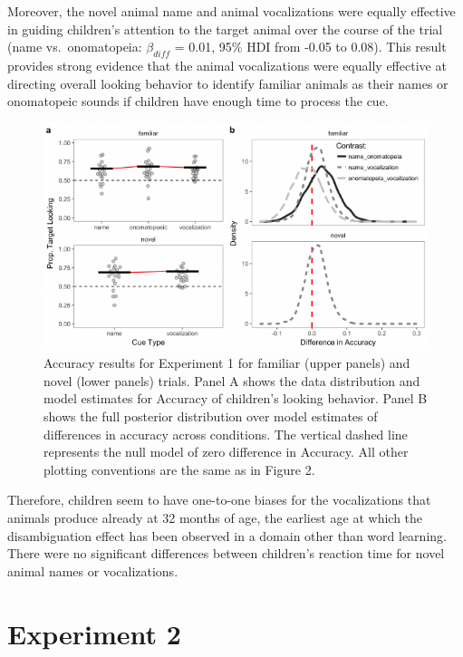 \documentclass[english,floatsintext,man]{apa6}
\theoremstyle{definition}
\theoremstyle{definition}
\theoremstyle{definition}
\theoremstyle{remark}
\begin{document}
Moreover, the novel animal name and animal vocalizations were equally
effective in guiding children's attention to the target animal over the
course of the trial (name vs.~onomatopeia: \(\beta_{diff}\) = 0.01, 95\%
HDI from -0.05 to 0.08). This result provides strong evidence that the
animal vocalizations were equally effective at directing overall looking
behavior to identify familiar animals as their names or onomatopeic
sounds if children have enough time to process the cue.

\begin{figure}[t]

{\centering \includegraphics[width=0.8\linewidth]{anime_manuscript_files/figure-latex/acc-plot-e1-1} 

}

\caption{Accuracy results for Experiment 1 for familiar (upper panels) and novel (lower panels) trials. Panel A shows the data distribution and model estimates for Accuracy of children's looking behavior. Panel B shows the full posterior distribution over model estimates of differences in accuracy across conditions. The vertical dashed line represents the null model of zero difference in Accuracy. All other plotting conventions are the same as in Figure 2.}\label{fig:acc-plot-e1}
\end{figure}

Therefore, children seem to have one-to-one biases for the vocalizations
that animals produce already at 32 months of age, the earliest age at
which the disambiguation effect has been observed in a domain other than
word learning. There were no significant differences between children's
reaction time for novel animal names or vocalizations.

\hypertarget{experiment-2}{%
\section{Experiment 2}\label{experiment-2}}
\end{document}
